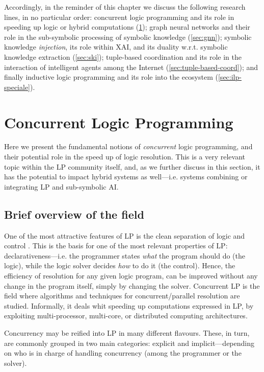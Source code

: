 \documentclass[12pt,a4paper,openright,twoside]{book}
\begin{document}
Accordingly, in the reminder of this chapter we discuss the following research lines, in no particular order:
%
concurrent logic programming and its role in speeding up logic or hybrid computations (\cref{sec:concurrent-lp});
%
graph neural networks and their role in the sub-symbolic processing of symbolic knowledge (\cref{sec:gnn});
%
symbolic knowledge \emph{injection}, its role within XAI, and its duality w.r.t. symbolic knowledge extraction (\cref{sec:ski});
%
tuple-based coordination and its role in the interaction of intelligent agents among the Internet (\cref{sec:tuple-based-coord}); and finally
%
inductive logic programming and its role into the \twopkt{} ecosystem (\cref{sec:ilp-speciale}).

\section{Concurrent Logic Programming}
\label{sec:concurrent-lp}


Here we present the fundamental notions of \emph{concurrent} logic programming, and their potential role in the speed up of logic resolution.
%
This is a very relevant topic within the LP community itself, and, as we further discuss in this section, it has the potential to impact hybrid systems as well---i.e. systems combining or integrating LP and sub-symbolic AI.

\subsection{Brief overview of the field}

One of the most attractive features of LP is the clean separation of logic and control \cite{Kowalski1979}.
%
This is the basis for one of the most relevant properties of LP: declarativeness---i.e. the programmer states \emph{what} the program should do (the logic), while the logic solver decides \emph{how} to do it (the control).
%
Hence, the efficiency of resolution for any given logic program, can be improved without any change in the program itself, simply by changing the solver.
%
Concurrent LP is the field where algorithms and techniques for concurrent/parallel resolution are studied.
%
Informally, it deals whit speeding up computations expressed in LP, by exploiting multi-processor, multi-core, or distributed computing architectures.

Concurrency may be reified into LP in many different flavours.
%
These, in turn, are commonly grouped in two main categories: explicit and implicit---depending on who is in charge of handling concurrency (among the programmer or the solver).
\end{document}
